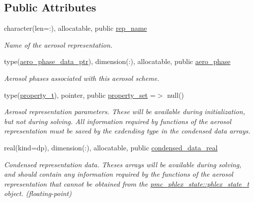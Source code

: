 \subsection*{Public Attributes}
\begin{DoxyCompactItemize}
\item 
character(len=\+:), allocatable, public \mbox{\hyperlink{structpmc__aero__rep__data_1_1aero__rep__data__t_aa5472b007f4f5a9743ff5c8dc7e9c56b}{rep\+\_\+name}}
\begin{DoxyCompactList}\small\item\em Name of the aerosol representation. \end{DoxyCompactList}\item 
type(\mbox{\hyperlink{structpmc__aero__phase__data_1_1aero__phase__data__ptr}{aero\+\_\+phase\+\_\+data\+\_\+ptr}}), dimension(\+:), allocatable, public \mbox{\hyperlink{structpmc__aero__rep__data_1_1aero__rep__data__t_ad377561864accd479058d9fefe85469f}{aero\+\_\+phase}}
\begin{DoxyCompactList}\small\item\em Aerosol phases associated with this aerosol scheme. \end{DoxyCompactList}\item 
type(\mbox{\hyperlink{structpmc__property_1_1property__t}{property\+\_\+t}}), pointer, public \mbox{\hyperlink{structpmc__aero__rep__data_1_1aero__rep__data__t_a87b1bf5cd10a0a2b51390fb24ebf56c5}{property\+\_\+set}} =$>$ null()
\begin{DoxyCompactList}\small\item\em Aerosol representation parameters. These will be available during initialization, but not during solving. All information required by functions of the aerosol representation must be saved by the exdending type in the condensed data arrays. \end{DoxyCompactList}\item 
real(kind=dp), dimension(\+:), allocatable, public \mbox{\hyperlink{structpmc__aero__rep__data_1_1aero__rep__data__t_a7dcb494303b1efa6467a162bc279211d}{condensed\+\_\+data\+\_\+real}}
\begin{DoxyCompactList}\small\item\em Condensed representation data. Theses arrays will be available during solving, and should contain any information required by the functions of the aerosol representation that cannot be obtained from the \mbox{\hyperlink{structpmc__phlex__state_1_1phlex__state__t}{pmc\+\_\+phlex\+\_\+state\+::phlex\+\_\+state\+\_\+t}} object. (floating-\/point) \end{DoxyCompactList}\item 

\end{DoxyCompactItemize}
